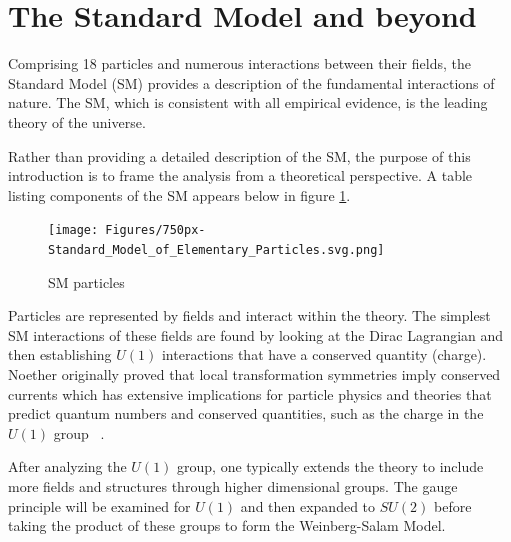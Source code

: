 \section{The Standard Model and beyond}




Comprising 18 particles and numerous interactions between their fields, the Standard Model (SM) provides a description of the fundamental interactions of nature.
The SM, which is consistent with all empirical evidence, is the leading theory of the universe. 


Rather than providing a detailed description of the SM, the purpose of this introduction is to frame the analysis from a theoretical perspective.
A table listing components of the SM appears below in figure \ref{fig:SM}. 
\begin{figure}[ht!b]
  \centering
  \texttt{[image: Figures/750px-Standard\_Model\_of\_Elementary\_Particles.svg.png]}
  \caption{\label{fig:SM} SM particles }
\end{figure}

Particles are represented by fields and interact within the theory. The simplest SM interactions of these fields are found by looking at the Dirac Lagrangian and then establishing $U(1)$ interactions that have a conserved quantity (charge). 
Noether originally proved that local transformation symmetries imply conserved currents which has extensive implications for particle physics and theories that predict quantum numbers and conserved quantities, such as the charge in the $U(1)$ group ~\cite{Noether_1971}. 

After analyzing the $U(1)$ group, one typically extends the theory to include more fields and structures through higher dimensional groups. The gauge principle will be examined for $U(1)$ and then expanded to $SU(2)$ before taking the product of these groups to form the Weinberg-Salam Model.


